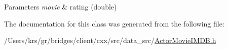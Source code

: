 \begin{DoxyParams}{Parameters}
{\em movie} & rating (double) \\
\hline
\end{DoxyParams}


The documentation for this class was generated from the following file\+:\begin{DoxyCompactItemize}
\item 
/\+Users/krs/gr/bridges/client/cxx/src/data\+\_\+src/\hyperlink{_actor_movie_i_m_d_b_8h}{Actor\+Movie\+I\+M\+D\+B.\+h}\end{DoxyCompactItemize}

